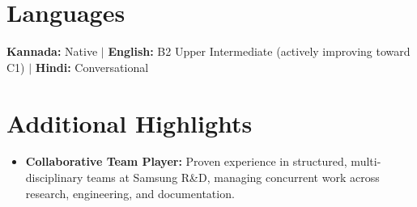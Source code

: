 \documentclass[letterpaper,11pt]{article}
\newcommand{\resumeItem}[1]{
  \item\small{
    {#1 \vspace{-2pt}}
  }
}
\newcommand{\resumeSubItem}[1]{\resumeItem{#1}\vspace{-4pt}}
\newcommand{\resumeSubHeadingListStart}{\begin{itemize}[leftmargin=0.15in, label={}]}
\newcommand{\resumeSubHeadingListEnd}{\end{itemize}}
\begin{document}
\section{Languages}
 \begin{itemize}[leftmargin=0.15in, label={}]
    \small{\item{
     \textbf{Kannada:} Native $|$
     \textbf{English:} B2 Upper Intermediate (actively improving toward C1) $|$
     \textbf{Hindi:} Conversational
    }}
 \end{itemize}

\section{Additional Highlights}
  \resumeSubHeadingListStart
    \resumeSubItem{\textbf{Collaborative Team Player:} Proven experience in structured, multi-disciplinary teams at Samsung R\&D, managing concurrent work across research, engineering, and documentation.}
    
  \resumeSubHeadingListEnd
\end{document}
